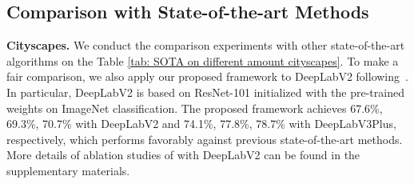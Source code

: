 \documentclass[10pt,twocolumn,letterpaper]{article}
\def\SOTA{state-of-the-art\xspace}
\begin{document}
{\subsection{Comparison with State-of-the-art Methods}
\noindent\textbf{Cityscapes.}
We conduct the comparison experiments with other state-of-the-art algorithms on the Table \ref{tab: SOTA  on different amount cityscapes}. To make a fair comparison, we also apply our proposed framework to DeepLabV2 following~\cite{hung2018adversarial}. In particular, DeepLabV2 is based on ResNet-101 initialized with the pre-trained weights on ImageNet classification. The proposed framework achieves 67.6\%, 69.3\%, 70.7\% with DeepLabV2 and 74.1\%, 77.8\%, 78.7\% with DeepLabV3Plus, respectively, which performs favorably against previous state-of-the-art methods. More details of ablation studies of with DeepLabV2 can be found in the supplementary materials.

\begin{table}
\begin{center}
\end{center}
\caption{Compared with  \SOTA methods on the Cityscapes val set. Here `'  means 
that 
we use   labeled data and the remaining images in the training set are used as unlabeled data.}
\label{tab: SOTA  on different amount cityscapes}
\vspace{-1em}
\end{table}


}
\end{document}
